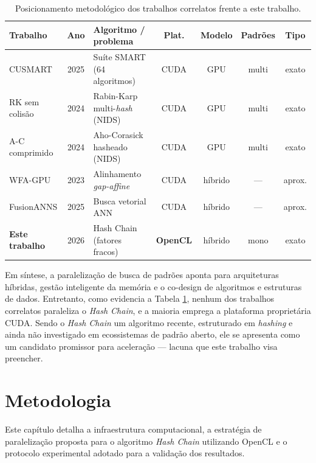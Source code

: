 \documentclass[12pt]{article}
\begin{document}
\begin{table}[htbp]
\centering
\caption{Posicionamento metodológico dos trabalhos correlatos frente a este trabalho.}
\label{tab:correlatos}
\footnotesize
\begin{tabular}{|l|c|p{3.0cm}|c|c|c|c|}
\hline
\textbf{Trabalho} & \textbf{Ano} & \textbf{Algoritmo / problema} & \textbf{Plat.} & \textbf{Modelo} & \textbf{Padrões} & \textbf{Tipo} \\ \hline
CUSMART \cite{ozsoy2025}              & 2025 & Suíte SMART (64 algoritmos)        & CUDA   & GPU     & multi & exato  \\ \hline
RK sem colisão \cite{abbas2024-rabinkarp} & 2024 & Rabin-Karp multi-\textit{hash} (NIDS) & CUDA   & GPU     & multi & exato  \\ \hline
A-C comprimido \cite{abbas2024-ahocorasick} & 2024 & Aho-Corasick hasheado (NIDS)     & CUDA   & GPU     & multi & exato  \\ \hline
WFA-GPU \cite{aguado-puig2023}        & 2023 & Alinhamento \textit{gap-affine}    & CUDA   & híbrido & ---   & aprox. \\ \hline
FusionANNS \cite{tian2025}            & 2025 & Busca vetorial ANN                 & CUDA   & híbrido & ---   & aprox. \\ \hline
\textbf{Este trabalho}                & 2026 & Hash Chain (fatores fracos)        & \textbf{OpenCL} & híbrido & mono & exato \\ \hline
\end{tabular}
\end{table}

Em síntese, a paralelização de busca de padrões aponta para arquiteturas híbridas, gestão inteligente da memória e o co-design de algoritmos e estruturas de dados. Entretanto, como evidencia a Tabela \ref{tab:correlatos}, nenhum dos trabalhos correlatos paraleliza o \textit{Hash Chain}, e a maioria emprega a plataforma proprietária CUDA. Sendo o \textit{Hash Chain} um algoritmo recente, estruturado em \textit{hashing} e ainda não investigado em ecossistemas de padrão aberto, ele se apresenta como um candidato promissor para aceleração — lacuna que este trabalho visa preencher.

\section{Metodologia}

Este capítulo detalha a infraestrutura computacional, a estratégia de paralelização proposta para o algoritmo \textit{Hash Chain} utilizando OpenCL e o protocolo experimental adotado para a validação dos resultados.
\end{document}
